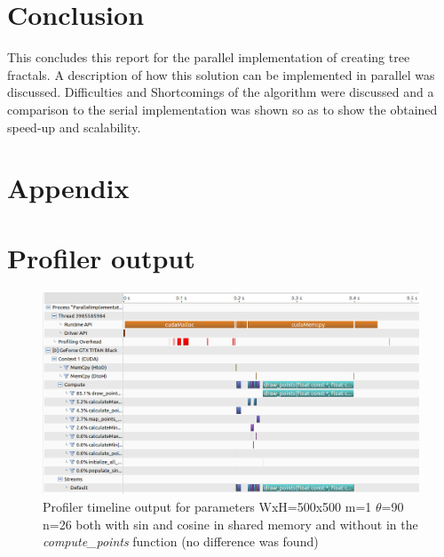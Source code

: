 \documentclass[11pt]{article}
\begin{document}




\section{Conclusion}
This concludes this report for the parallel implementation of creating tree fractals. A description of how this solution can be implemented in parallel was discussed. Difficulties and Shortcomings of the algorithm were discussed and a comparison to the serial implementation was shown so as to show the obtained speed-up and scalability.




\onecolumn
\section*{Appendix}
\appendix
\section{Profiler output}
\begin{figure}[H]
	\includegraphics[width=.95\linewidth]{Images/500x500_1_90_26_profilerOutput.png}
	\centering
	\caption{Profiler timeline output for parameters WxH=500x500 m=1 $\theta$=90 n=26 both with sin and cosine in shared memory and without in the \textit{compute\_points} function (no difference was found)}
	\label{fig:profiler}
\end{figure}

\pagebreak

%
\end{document}
